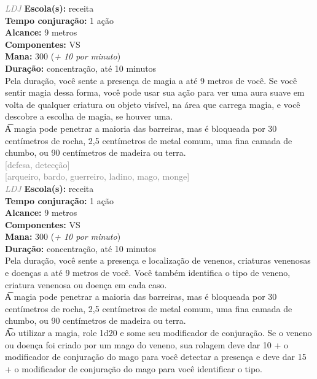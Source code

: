\documentclass{RPG_Adventure}[2021/10/20]
\begin{document}
{\tiny \textcolor{gray}{\textit{LDJ}}}
{\small \t \textbf{Escola(s):} receita\\\t \textbf{Tempo conjuração:} 1 ação\\\t \textbf{Alcance:} 9 metros\\\t \textbf{Componentes:} VS\\\t \textbf{Mana:} 300 (\textit{+ 10 por minuto})\\\t \textbf{Duração:} concentração, até 10 minutos\\}
{\normalsize Pela duração, você sente a presença de magia a até 9 metros de você. Se você sentir magia dessa forma, você pode usar sua ação para ver uma aura suave em volta de qualquer criatura ou objeto visível, na área que carrega magia, e você descobre a escolha de magia, se houver uma.\\\t A magia pode penetrar a maioria das barreiras, mas é bloqueada por 30 centímetros de rocha, 2,5 centímetros de metal comum, uma fina camada de chumbo, ou 90 centímetros de madeira ou terra.\\}
{\scriptsize \textcolor{gray}{[defesa, detecção]\\}}
{\scriptsize \textcolor{gray}{[arqueiro, bardo, guerreiro, ladino, mago, monge]\\}}
{\tiny \textcolor{gray}{\textit{LDJ}}}
{\small \t \textbf{Escola(s):} receita\\\t \textbf{Tempo conjuração:} 1 ação\\\t \textbf{Alcance:} 9 metros\\\t \textbf{Componentes:} VS\\\t \textbf{Mana:} 300 (\textit{+ 10 por minuto})\\\t \textbf{Duração:} concentração, até 10 minutos\\}
{\normalsize Pela duração, você sente a presença e localização de venenos, criaturas venenosas e doenças a até 9 metros de você. Você também identifica o tipo de veneno, criatura venenosa ou doença em cada caso.\\\t A magia pode penetrar a maioria das barreiras, mas é bloqueada por 30 centímetros de rocha, 2,5 centímetros de metal comum, uma fina camada de chumbo, ou 90 centímetros de madeira ou terra.\\\t Ao utilizar a magia, role 1d20 e some seu modificador de conjuração. Se o veneno ou doença foi criado por um mago do veneno, sua rolagem deve dar 10 + o modificador de conjuração do mago para você detectar a presença e deve dar 15 + o modificador de conjuração do mago para você identificar o tipo.\\}
\end{document}

